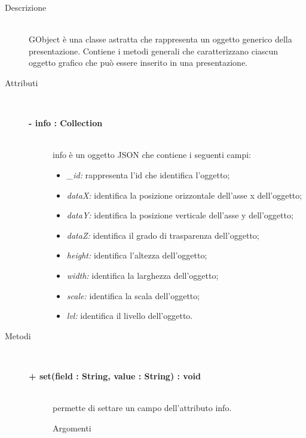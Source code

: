 \begin{description}
\item[Descrizione] \hfill \\
	GObject è una classe astratta che rappresenta un oggetto generico della presentazione. Contiene i metodi generali che caratterizzano ciascun oggetto grafico che può essere inserito in una presentazione.
	
\item[Attributi] \hfill \\
	\begin{description}
		\item[\textbf{- info : Collection			}] \hfill \\
			info è un oggetto JSON che contiene i seguenti campi:
				\begin{itemize}
					\item \textit{\_id:} rappresenta l'id che identifica l'oggetto;
					\item \textit{dataX:} identifica la posizione orizzontale dell'asse x dell'oggetto;
					\item \textit{dataY:} identifica la posizione verticale dell'asse y dell'oggetto;
					\item \textit{dataZ:} identifica il grado di trasparenza dell'oggetto; %
					\item \textit{height:} identifica l'altezza dell'oggetto;
					\item \textit{width:} identifica la larghezza dell'oggetto;
					\item \textit{scale:} identifica la scala dell'oggetto; %
					\item \textit{lvl:} identifica il livello dell'oggetto. %
				\end{itemize}
					 
		
	\end{description}
	
	
\item[Metodi] \hfill \\

	\begin{description}
		\item[\textbf{+ set(field : String, value : String) : void			}] \hfill \\
			permette di settare un campo dell'attributo info.
			
		\begin{description}
			\item[Argomenti] \hfill \\
				\begin{itemize}
				

\end{itemize}
\end{description}
\end{description}
\end{description}
